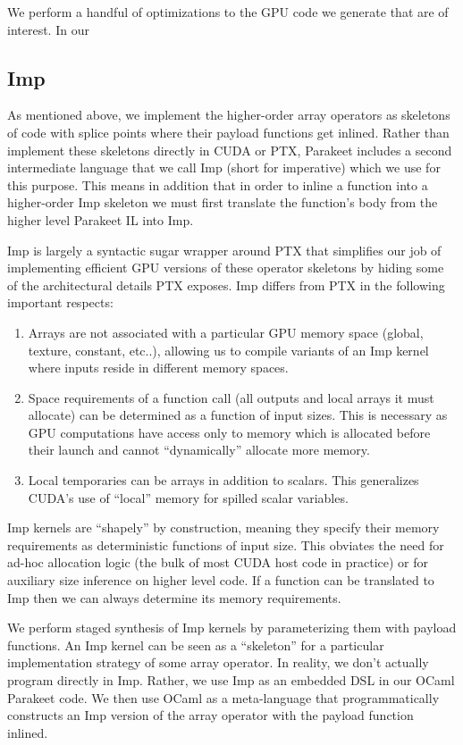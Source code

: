 \documentclass[preprint]{sigplanconf}
\begin{document}
We perform a handful of optimizations to the GPU code we generate that are of interest.  In our 

\subsection{Imp}
\label{Imp}

As mentioned above, we implement the higher-order array operators as skeletons of code with splice points where their payload functions get inlined.  Rather than implement these skeletons directly in CUDA or PTX, Parakeet includes a second intermediate language that we call Imp (short for imperative) which we use for this purpose.  This means in addition that in order to inline a function into a higher-order Imp skeleton we must first translate the function's body from the higher level Parakeet IL into Imp.

Imp is largely a syntactic sugar wrapper around PTX that simplifies our job of implementing efficient GPU versions of these operator skeletons by hiding some of the architectural details PTX exposes. Imp differs from PTX in the following important respects:

\begin{enumerate}
\item  Arrays are not associated with a particular GPU memory space (global, texture, constant, etc..), allowing us to compile variants of an Imp kernel where inputs reside in different memory spaces.

\item Space requirements of a function call (all outputs and local arrays it must allocate) can be determined as a function of input sizes. This is necessary as GPU computations have access only to memory which is allocated before their launch and cannot ``dynamically'' allocate more memory.

\item Local temporaries can be arrays in addition to scalars. This generalizes CUDA's use of ``local'' memory for spilled scalar variables.
\end{enumerate}
Imp kernels are ``shapely'' by construction, meaning they specify their memory requirements as deterministic functions of input size. This obviates the need for ad-hoc allocation logic (the bulk of most CUDA host code in practice) or for auxiliary size inference on higher level code. If a function can be translated to Imp then we can always determine its memory requirements.

We perform staged synthesis of Imp kernels by parameterizing them with payload functions. An Imp kernel can be seen as a ``skeleton'' \cite{Cole04} for a particular implementation strategy of some array operator. In reality, we don't actually program directly in Imp.  Rather, we use Imp as an embedded DSL in our OCaml Parakeet code.  We then use OCaml as a meta-language that programmatically constructs an Imp version of the array operator with the payload function inlined.
\end{document}
